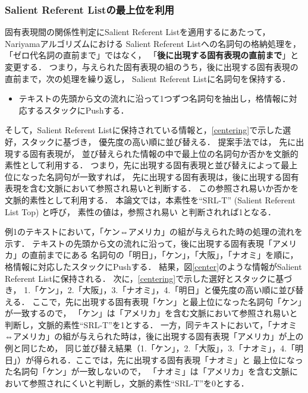 \documentclass[japanese]{jnlp_1.4}
\begin{document}
\subsubsection{Salient Referent Listの最上位を利用}
\label{tekiyou}

固有表現間の関係性判定にSalient Referent Listを適用するにあたって，
Nariyamaアルゴリズムにおける
Salient Referent Listへの名詞句の格納処理を，
「ゼロ代名詞の直前まで」ではなく，
「{\bf 後に出現する固有表現の直前まで}」と変更する．
つまり，与えられた固有表現の組のうち，後に出現する固有表現の直前まで，次の処理を繰り返し，
Salient Referent Listに名詞句を保持する．

\vspace{1\baselineskip}
\begin{itemize}
\item テキストの先頭から文の流れに沿って1つずつ名詞句を抽出し，格情報に対応するスタックにPushする．
\end{itemize}
\vspace{1\baselineskip}

そして，Salient Referent Listに保持されている情報と，{\ref{centering}}で示した選好，スタックに基づき，
優先度の高い順に並び替える．
提案手法では，
先に出現する固有表現が，
並び替えられた情報の中で最上位の名詞句か否かを文脈的素性として利用する．
つまり，先に出現する固有表現と並び替えによって最上位になった名詞句が一致すれば，
先に出現する固有表現は，後に出現する固有表現を含む文脈において参照され易いと判断する．
この参照され易いか否かを文脈的素性として利用する．
本論文では，本素性を``SRL-T'' (Salient Referent List Top) と呼び，
素性の値は，参照され易い
と判断されれば1となる．

例1のテキストにおいて，「ケン⇔アメリカ」の組が与えられた時の処理の流れを示す．
テキストの先頭から文の流れに沿って，後に出現する固有表現「アメリカ」の直前までにある
名詞句の「明日」，「ケン」，「大阪」，「ナオミ」を順に，格情報に対応したスタックにPushする．
結果，図{\ref{center}}のような情報がSalient Referent Listに保持される．
次に，{\ref{centering}}で示した選好とスタックに基づき，
1.「ケン」，2.「大阪」，3.「ナオミ」，4.「明日」と優先度の高い順に並び替える．
ここで，先に出現する固有表現「ケン」と最上位になった名詞句「ケン」が一致するので，
「ケン」は「アメリカ」を含む文脈において参照され易いと判断し，文脈的素性``SRL-T''を1とする．
一方，同テキストにおいて，「ナオミ⇔アメリカ」の組が与えられた時は，後に出現する固有表現「アメリカ」が上の例と同じため，
同じ並び替え結果（1.「ケン」，2.「大阪」，3.「ナオミ」，4.「明日」）が得られる．ここでは，先に出現する固有表現「ナオミ」と
最上位になった名詞句「ケン」が一致しないので，
「ナオミ」は「アメリカ」を含む文脈において参照されにくいと判断し，文脈的素性``SRL-T''を0とする．
\end{document}
